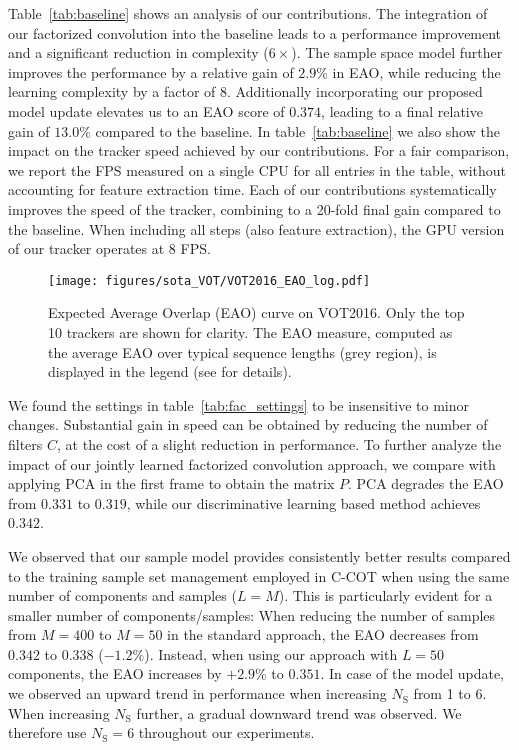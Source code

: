 \documentclass[10pt,twocolumn,letterpaper]{article}
\begin{document}
Table~\ref{tab:baseline} shows an analysis of our contributions. The integration of our factorized convolution into the baseline leads to a performance improvement and a significant reduction in complexity ($6 \times$). The sample space model further improves the performance by a relative gain of $2.9 \%$ in EAO, while reducing the learning complexity by a factor of $8$. Additionally incorporating our proposed model update elevates us to an EAO score of $0.374$, leading to a final relative gain of $13.0 \%$ compared to the baseline. In table~\ref{tab:baseline} we also show the impact on the tracker speed achieved by our contributions. For a fair comparison, we report the FPS measured on a single CPU for all entries in the table, without accounting for feature extraction time. Each of our contributions systematically improves the speed of the tracker, combining to a 20-fold final gain compared to the baseline. When including all steps (also feature extraction), the GPU version of our tracker operates at 8 FPS.

\begin{figure}[!t]
	\centering \newcommand{\wid}{0.8\columnwidth}
	\texttt{[image: figures/sota\_VOT/VOT2016\_EAO\_log.pdf]}\vspace{-0.5mm}
	\caption{Expected Average Overlap (EAO) curve on VOT2016. Only the top 10 trackers are shown for clarity. The EAO measure, computed as the average EAO over typical sequence lengths (grey region), is displayed in the legend (see \cite{VOT2015} for details).
}\vspace{-2mm}\label{fig:vot_eao}
\end{figure}

We found the settings in table~\ref{tab:fac_settings} to be insensitive to minor changes. Substantial gain in speed can be obtained by reducing the number of filters $C$, at the cost of a slight reduction in performance. To further analyze the impact of our jointly learned factorized convolution approach, we compare with applying PCA in the first frame to obtain the matrix $P$. PCA degrades the EAO from $0.331$ to $0.319$, while our discriminative learning based method achieves $0.342$.

We observed that our sample model provides consistently better results compared to the training sample set management employed in C-COT when using the same number of components and samples ($L = M$). This is particularly evident for a smaller number of components/samples: When reducing the number of samples from $M = 400$ to $M = 50$ in the standard approach, the EAO decreases from $0.342$ to $0.338$ ($- 1.2 \%$). Instead, when using our approach with $L = 50$ components, the EAO increases by $+ 2.9 \%$ to $0.351$. In case of the model update, we observed an upward trend in performance when increasing $N_\text{S}$ from 1 to 6. When increasing $N_\text{S}$ further, a gradual downward trend was observed. We therefore use $N_\text{S} = 6$ throughout our experiments.
\end{document}
